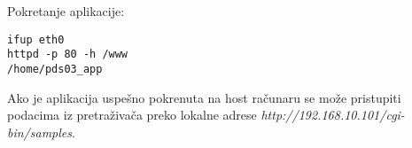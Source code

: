 \documentclass{article}
\begin{document}







Pokretanje aplikacije:

\begin{commandline}
  \begin{verbatim}
ifup eth0
httpd -p 80 -h /www
/home/pds03_app
  \end{verbatim}
\end{commandline}




Ako je aplikacija uspešno pokrenuta na host računaru se može pristupiti podacima iz pretraživača  preko lokalne adrese
\textit{http://192.168.10.101/cgi-bin/samples}.


\end{document}
